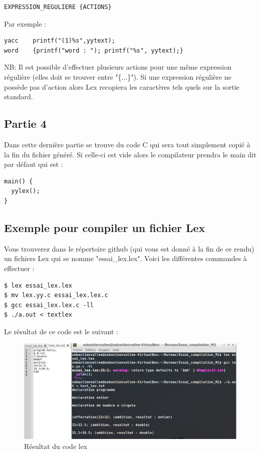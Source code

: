 \begin{verbatim}
EXPRESSION_REGULIERE {ACTIONS}
\end{verbatim}

Par exemple :

\begin{verbatim}
yacc    printf("(1)%s",yytext);
word    {printf("word : "); printf("%s", yytext);} 
\end{verbatim}

NB: Il est possible d'effectuer plusieurs actions pour une même expression régulière (elles doit se trouver entre "\{...\}"). Si une expression régulière ne possède pas d'action alors Lex recopiera les caractères tels quels sur la sortie standard.

\subsection{Partie 4}
Dans cette dernière partie se trouve du code C qui sera tout simplement copié à la fin du fichier généré. Si celle-ci est vide alors le compilateur prendra le main dit par défaut qui est :
\begin{verbatim}
main() {
  yylex();
}
\end{verbatim}

\subsection{Exemple pour compiler un fichier Lex} 
Vous trouverez dans le répertoire github (qui vous est donné à la fin de ce rendu) un fichiers Lex qui se nomme "essai\_lex.lex". Voici les différentes commandes à effectuer :

\begin{verbatim}
$ lex essai_lex.lex
$ mv lex.yy.c essai_lex.lex.c
$ gcc essai_lex.lex.c -ll
$ ./a.out < textlex
\end{verbatim}


Le résultat de ce code est le suivant :

\begin{figure}[h]
    \centerline{\includegraphics[scale=0.6]{data/lex}}
    \caption{Résultat du code lex}
    \label{fig:lex}
\end{figure}

